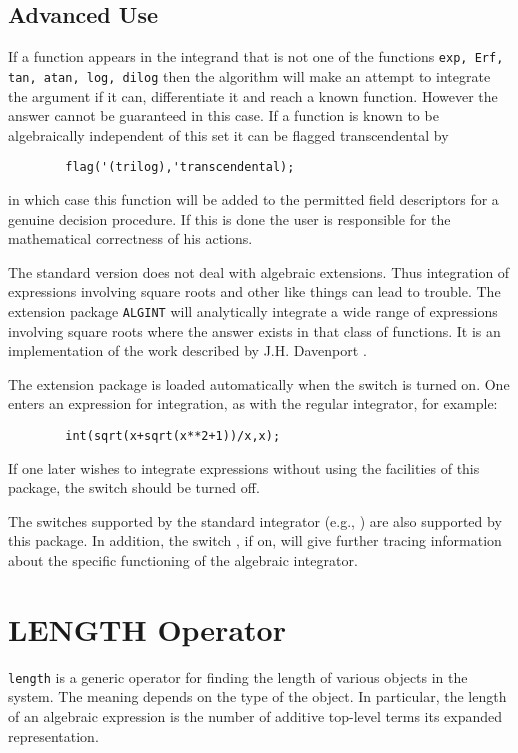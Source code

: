 \subsection{Advanced Use}
\hypertarget{operator:ERF}{}

If a function appears in the integrand that is not one of the functions
\texttt{exp, Erf, tan, atan, log, dilog}
then the algorithm will make an
attempt to integrate the argument if it can, differentiate it and reach a
known function.  However the answer cannot be guaranteed in this case.  If
a function is known to be algebraically independent of this set it can be
flagged transcendental by
\begin{verbatim}
        flag('(trilog),'transcendental);
\end{verbatim}
in which case this function will be added to the permitted field
descriptors for a genuine decision procedure. If this is done the user is
responsible for the mathematical correctness of his actions.


The standard version does not deal with algebraic extensions. Thus
integration of expressions involving square roots and other like things
can lead to trouble.  The extension package \texttt{ALGINT}
will analytically integrate a wide range of
expressions involving square roots where the answer exists in that class
of functions. It is an implementation of the work described by J.H.
Davenport \cite{Davenport:81}.

\hypertarget{switch:ALGINT}{}
The extension package is loaded automatically when the switch 
is turned on.
One enters an expression for integration, as with the regular integrator,
for example:
\begin{verbatim}
        int(sqrt(x+sqrt(x**2+1))/x,x);
\end{verbatim}
If one later wishes to integrate expressions without using the facilities of
this package, the switch   should be turned
off.

\hypertarget{switch:TRA}{}
The switches supported by the standard integrator (e.g., )
 are also supported by this package.  In addition, the
switch ,  if on, will give further tracing
information about the specific functioning of the algebraic integrator.



\section{LENGTH Operator}
\hypertarget{operator:LENGTH}{}
\texttt{length} is a generic operator for finding the
length of various objects in the system.  The meaning depends on the type
of the object.  In particular, the length of an algebraic expression is
the number of additive top-level terms its expanded representation.

